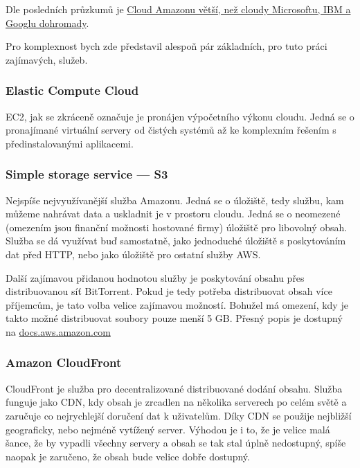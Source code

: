 Dle posledních průzkumů je \href{http://connect.zive.cz/bleskovky/cloud-amazonu-je-vetsi-nez-cloudy-microsoftu-ibm-a-googlu-dohromady/sc-321-a-171477/default.aspx}{Cloud Amazonu větší, než cloudy Microsoftu, IBM a Googlu dohromady\cite{zive:amazonCloud}}.

Pro komplexnost bych zde představil alespoň pár základních, pro tuto práci zajímavých, služeb.

\subsubsection{Elastic Compute Cloud}
EC2, jak se zkráceně označuje je pronájen výpočetního výkonu cloudu. Jedná se o pronajímané virtuální servery od čistých systémů až ke komplexním řešením s předinstalovanými aplikacemi.

\subsubsection{Simple storage service --- S3}
Nejspíše nejvyužívanější služba Amazonu. Jedná se o úložiště, tedy službu, kam můžeme nahrávat data a uskladnit je v prostoru cloudu. Jedná se o neomezené (omezením jsou finanční možnosti hostované firmy) úložiště pro libovolný obsah. Služba se dá využívat buď samostatně, jako jednoduché úložiště s poskytováním dat před HTTP, nebo jako úložiště pro ostatní služby AWS.

Další zajímavou přidanou hodnotou služby je poskytování obsahu přes distribuovanou síť BitTorrent. Pokud je tedy potřeba distribuovat obsah více příjemcům, je tato volba velice zajímavou možností. Bohužel má omezení, kdy je takto možné distribuovat soubory pouze menší 5 GB. Přesný popis je dostupný na \href{http://docs.aws.amazon.com/AmazonS3/latest/dev/S3Torrent.html}{docs.aws.amazon.com}

\subsubsection{Amazon CloudFront}
CloudFront je služba pro decentralizované distribuované dodání obsahu. Služba funguje jako CDN, kdy obsah je zrcadlen na několika serverech po celém světě a zaručuje co nejrychlejší doručení dat k uživatelům. Díky CDN se použije nejbližší geograficky, nebo nejméně vytížený server. Výhodou je i to, že je velice malá šance, že by vypadli všechny servery a obsah se tak stal úplně nedostupný, spíše naopak je zaručeno, že obsah bude velice dobře dostupný.

